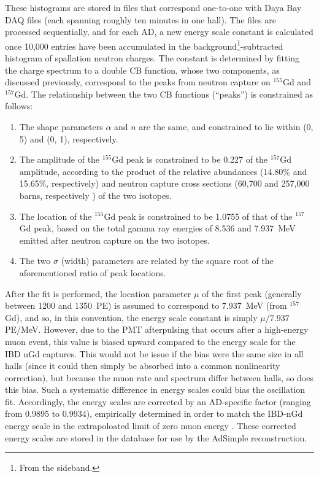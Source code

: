 \documentclass[../thesis.tex]{subfiles}
\begin{document}
\begin{comment}
  Note: For AdSimpleNL, in reconstruction, a (AD-specific?) scale constant is applied to the non-NL energy scale constant. See line 209 of QsumEnergyTool.cc. Discuss this?
\end{comment}

These histograms are stored in files that correspond one-to-one with Daya Bay DAQ files (each spanning roughly ten minutes in one hall). The files are processed sequentially, and for each AD, a new energy scale constant is calculated once 10,000 entries have been accumulated in the background\footnote{From the sideband.}-subtracted histogram of spallation neutron charges. The constant is determined by fitting the charge spectrum to a double CB function, whose two components, as discussed previously, correspond to the peaks from neutron capture on $^{155}$Gd and $^{157}$Gd. The relationship between the two CB functions (``peaks'') is constrained as follows:

\begin{enumerate}
\item The shape parameters $\alpha$ and $n$ are the same, and constrained to lie within (0, 5) and (0, 1), respectively.
\item The amplitude of the $^{155}$Gd peak is constrained to be 0.227 of the $^{157}$Gd amplitude, according to the product of the relative abundances (14.80\% and 15.65\%, respectively) and neutron capture cross sections (60,700 and 257,000 barns, respectively \cite{doi:10.13182/NSE05-64}) of the two isotopes.
\item The location of the $^{155}$Gd peak is constrained to be 1.0755 of that of the $^{157}$Gd peak, based on the total gamma ray energies of 8.536 and 7.937~MeV emitted after neutron capture on the two isotopes.
\item The two $\sigma$ (width) parameters are related by the square root of the aforementioned ratio of peak locations.
\end{enumerate}

After the fit is performed, the location parameter $\mu$ of the first peak (generally between 1200 and 1350~PE) is assumed to correspond to 7.937~MeV (from $^{157}$Gd), and so, in this convention, the energy scale constant is simply $\mu/7.937$ PE/MeV. However, due to the PMT afterpulsing that occurs after a high-energy muon event, this value is biased upward compared to the energy scale for the IBD nGd captures. This would not be issue if the bias were the same size in all halls (since it could then simply be absorbed into a common nonlinearity correction), but because the muon rate and spectrum differ between halls, so does this bias. Such a systematic difference in energy scales could bias the oscillation fit. Accordingly, the energy scales are corrected by an AD-specific factor (ranging from 0.9895 to 0.9934), empirically determined in order to match the IBD-nGd energy scale in the extrapoloated limit of zero muon energy \cite{spallScaleCorr}. These corrected energy scales are stored in the database for use by the AdSimple reconstruction.
\end{document}
